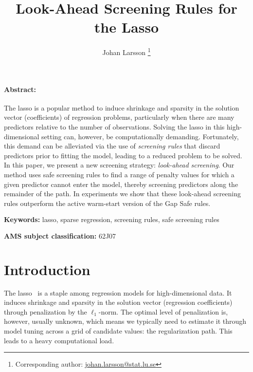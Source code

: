 \documentclass[b5paper,10pt,abstractoff,DIV=calc,headings=normal,twoside]{scrartcl}
\makeatletter
\newcommand{\shortauthor}{}
\newcommand{\shorttitle}{\@title}
\def\AMS#1{\par\noindent \textbf{AMS subject classification: }#1\par}
\newcommand{\keywords}[1]{\par\noindent\textbf{Keywords: }#1}
\theoremstyle{plain}
\theoremstyle{definition}
\theoremstyle{remark}
\renewenvironment{abstract}{\bigskip\noindent\begin{minipage}{\textwidth}\setlength{\parindent}{15pt}\paragraph{Abstract:}}{\end{minipage}}
\makeatother
\begin{document}

\renewcommand{\shortauthor}{J. Larsson}

\title{Look-Ahead Screening Rules for the Lasso}

\author[1]{Johan Larsson%
  \thanks{%
    Corresponding author: \href{mailto:johan.larsson@stat.lu.se}{\url{johan.larsson@stat.lu.se}}
  }%
}

\maketitle

\begin{abstract}
  The lasso is a popular method to induce shrinkage and sparsity in the
  solution vector (coefficients) of regression problems, particularly
  when there are many predictors relative to the number of observations. Solving
  the lasso in this high-dimensional setting can, however, be computationally
  demanding. Fortunately, this demand can be alleviated via the
  use of \emph{screening rules} that discard predictors prior to
  fitting the model, leading to a reduced problem to be solved.
  In this paper, we present a new screening strategy: \emph{look-ahead
    screening}. Our method uses safe screening rules to find a range of
  penalty values for which a given predictor cannot enter the model,
  thereby screening predictors along the remainder of the path.
  In experiments we show that these look-ahead screening rules outperform the
  active warm-start version of the Gap Safe rules.
\end{abstract}

\keywords{lasso, sparse regression, screening rules, safe screening rules}

\smallskip

\AMS{62J07}

\section{Introduction}\label{sec:introduction}

The lasso~\cite{tibshirani1996} is a staple among regression models for
high-dimensional data. It induces shrinkage and sparsity in the solution
vector (regression coefficients) through penalization by the
\(\ell_1\)-norm. The optimal level of penalization is, however, usually
unknown, which means we typically need to estimate it through model tuning
across a grid of candidate values: the regularization path. This leads to a
heavy computational load.
\end{document}

